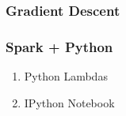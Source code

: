 \documentclass[12pt]{beamer}
\begin{document}
\begin{frame}\frametitle{Gradient Descent}

\end{frame}

\begin{frame}\frametitle{Spark + Python}
\begin{enumerate}[--]
\item Python Lambdas
\item IPython Notebook
\end{enumerate}
\end{frame}
\end{document}
